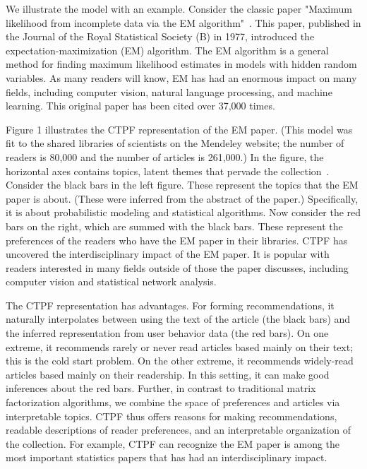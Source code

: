 \documentclass{article}
\begin{document}
We illustrate the model with an example. Consider the classic paper
"Maximum likelihood from incomplete data via the EM
algorithm"~\cite{Dempster:1977}. This paper, published in the Journal
of the Royal Statistical Society (B) in 1977, introduced the
expectation-maximization (EM) algorithm.  The EM algorithm is a
general method for finding maximum likelihood estimates in models with
hidden random variables. As many readers will know, EM has had an
enormous impact on many fields, including computer vision, natural
language processing, and machine learning. This original paper has
been cited over 37,000 times.

Figure 1 illustrates the CTPF representation of the EM paper.  (This model
was fit to the shared libraries of scientists on the Mendeley website;
the number of readers is 80,000 and the number of articles is
261,000.)  In the figure, the horizontal axes contains topics, latent
themes that pervade the collection~\cite{Blei:2003b}.  Consider the
black bars in the left figure.  These represent the topics that the EM
paper is about.  (These were inferred from the abstract of the paper.)
Specifically, it is about probabilistic modeling and statistical
algorithms.  Now consider the red bars on the right, which are summed
with the black bars.  These represent the preferences of the readers
who have the EM paper in their libraries. CTPF has uncovered the
interdisciplinary impact of the EM paper.  It is popular with readers
interested in many fields outside of those the paper discusses,
including computer vision and statistical network analysis.

The CTPF representation has advantages.  For forming recommendations,
it naturally interpolates between using the text of the article (the
black bars) and the inferred representation from user behavior data
(the red bars).  On one extreme, it recommends rarely or never read
articles based mainly on their text; this is the cold start problem.
On the other extreme, it recommends widely-read articles based mainly
on their readership.  In this setting, it can make good inferences
about the red bars.  Further, in contrast to traditional matrix
factorization algorithms, we combine the space of preferences and
articles via interpretable topics. CTPF thus offers reasons for making
recommendations, readable descriptions of reader preferences, and an
interpretable organization of the collection.  For example, CTPF can
recognize the EM paper is among the most important statistics papers
that has had an interdisciplinary impact.
\end{document}
